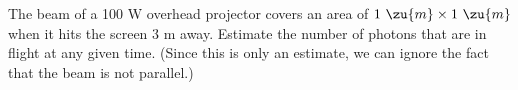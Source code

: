 The beam of a 100 W overhead projector covers an area of
$1\ \zu{m}\times1\ \zu{m}$ when it hits the screen 3 m away. Estimate
the number of photons that are in flight at any given time.
(Since this is only an estimate, we can ignore the fact that
the beam is not parallel.)\answercheck
